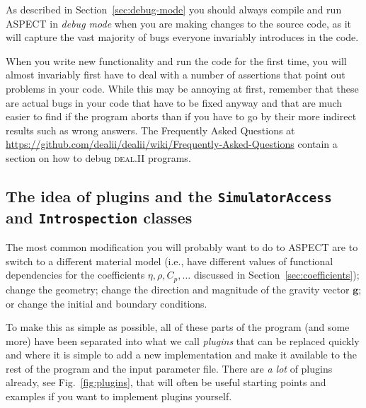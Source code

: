 \documentclass{article}
\newcommand{\dealii}{{\textsc{deal.II}}}
\newcommand{\aspect}{\textsc{ASPECT}}
\begin{document}
As described in Section~\ref{sec:debug-mode} you should always compile and run
\aspect{} in \textit{debug mode} when you are making changes to the source
code, as it will capture the vast majority of bugs everyone invariably
introduces in the code.

When you write new functionality and run
the code for the first time, you will almost invariably first have to deal
with a number of assertions that point out problems in your code. While
this may be annoying at first, remember that these are actual bugs in your
code that have to be fixed anyway and that are much easier to find if the
program aborts than if you have to go by their more indirect results such as
wrong answers. The Frequently Asked Questions at
\url{https://github.com/dealii/dealii/wiki/Frequently-Asked-Questions}
contain a section on how to debug \dealii{} programs.

\subsection{The idea of plugins and the \texttt{SimulatorAccess} and \texttt{Introspection} classes}
\label{sec:plugins}

The most common modification you will probably want to do to \aspect{} are to
switch to a different material model (i.e., have different values of
functional dependencies for the coefficients $\eta,\rho,C_p, \ldots$ discussed
in Section~\ref{sec:coefficients}); change the geometry; change the direction
and magnitude of the gravity vector $\mathbf g$; or change the initial and
boundary conditions.

To make this as simple as possible, all of these parts of the program (and some more) have
been separated into what we call \textit{plugins} that can be replaced quickly
and where it is simple to add a new implementation and make it available to the rest of the
program and the input parameter file. There are \textit{a lot} of plugins
already, see Fig.~\ref{fig:plugins}, that will often be useful starting points
and examples if you want to implement plugins yourself.
\end{document}

